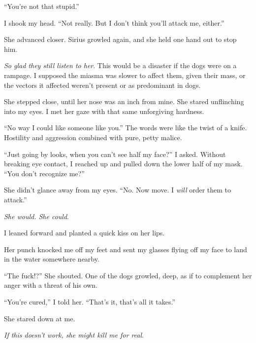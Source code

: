 ``You're not that stupid.''



I shook my head.  ``Not really.  But I don't think you'll attack me, either.''



She advanced closer.  Sirius growled again, and she held one hand out to stop him.



\emph{So glad they still listen to her}.  This would be a disaster if the dogs were on a rampage.  I supposed the miasma was slower to affect them, given their mass, or the vectors it affected weren't present or as predominant in dogs.



She stepped close, until her nose was an inch from mine.  She stared unflinching into my eyes.  I met her gaze with that same unforgiving hardness.



``No way I could like someone like you.''  The words were like the twist of a knife.  Hostility and aggression combined with pure, petty malice.



``Just going by looks, when you can't see half my face?'' I asked.  Without breaking eye contact, I reached up and pulled down the lower half of my mask.  ``You don't recognize me?''



She didn't glance away from my eyes.  ``No.  Now move.  I \emph{will} order them to attack.''



\emph{She would.  She could}.



I leaned forward and planted a quick kiss on her lips.



Her punch knocked me off my feet and sent my glasses flying off my face to land in the water somewhere nearby.



``The fuck!?''  She shouted.  One of the dogs growled, deep, as if to complement her anger with a threat of his own.



``You're cured,'' I told her.  ``That's it, that's all it takes.''



She stared down at me.



\emph{If this doesn't work, she might kill me for real}.



